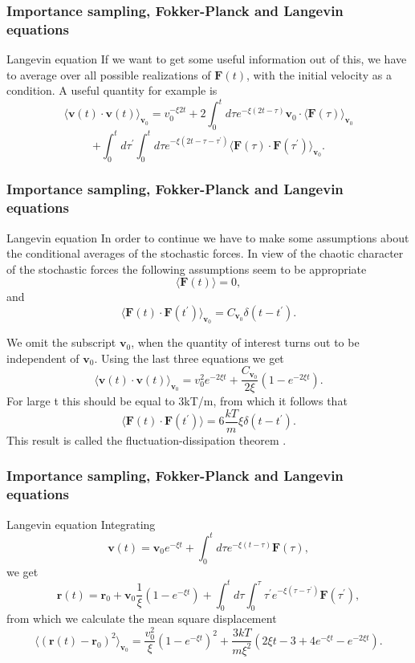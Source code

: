 \documentclass{beamer}
\begin{document}
\begin{frame}
\frametitle{Importance sampling, Fokker-Planck and Langevin equations}

\begin{block}{Langevin equation }
If we want to get some useful information out of this, we have to average over all possible realizations of 
$\mathbf{F}(t)$, with the initial velocity as a condition. A useful quantity for example is
\[ 
\langle \mathbf{v}(t)\cdot \mathbf{v}(t)\rangle_{\mathbf{v}_{0}}=v_{0}^{-\xi 2t}
+2\int_{0}^{t}d\tau e^{-\xi (2t-\tau)}\mathbf{v}_{0}\cdot \langle \mathbf{F}(\tau )\rangle_{\mathbf{v}_{0}}
\]
\[  	  	
 +\int_{0}^{t}d\tau ^{\prime }\int_{0}^{t}d\tau e^{-\xi (2t-\tau -\tau ^{\prime })}
\langle \mathbf{F}(\tau )\cdot \mathbf{F}(\tau ^{\prime })\rangle_{ \mathbf{v}_{0}}.
\]
\end{block}
\end{frame}

\begin{frame}
\frametitle{Importance sampling, Fokker-Planck and Langevin equations}

\begin{block}{Langevin equation }
In order to continue we have to make some assumptions about the conditional averages of the stochastic forces. 
In view of the chaotic character of the stochastic forces the following 
assumptions seem to be appropriate
\[ 
\langle \mathbf{F}(t)\rangle=0, 
\]
and
\[
\langle \mathbf{F}(t)\cdot \mathbf{F}(t^{\prime })\rangle_{\mathbf{v}_{0}}=  C_{\mathbf{v}_{0}}\delta (t-t^{\prime }).
\] 	

We omit the subscript $\mathbf{v}_{0}$, when the quantity of interest turns out to be independent of $\mathbf{v}_{0}$. Using the last three equations we get
 \[
\langle \mathbf{v}(t)\cdot \mathbf{v}(t)\rangle_{\mathbf{v}_{0}}=v_{0}^{2}e^{-2\xi t}+\frac{C_{\mathbf{v}_{0}}}{2\xi }(1-e^{-2\xi t}).
\]
For large t this should be equal to 3kT/m, from which it follows that
\[
\langle \mathbf{F}(t)\cdot \mathbf{F}(t^{\prime })\rangle =6\frac{kT}{m}\xi \delta (t-t^{\prime }). 
\]
This result is called the fluctuation-dissipation theorem .
\end{block}
\end{frame}

\begin{frame}
\frametitle{Importance sampling, Fokker-Planck and Langevin equations}

\begin{block}{Langevin equation }
Integrating 
 \[ 
\mathbf{v}(t)=\mathbf{v}_{0}e^{-\xi t}+\int_{0}^{t}d\tau e^{-\xi (t-\tau )}\mathbf{F }(\tau ), 
\] 
we get
\[
\mathbf{r}(t)=\mathbf{r}_{0}+\mathbf{v}_{0}\frac{1}{\xi }(1-e^{-\xi t})+
\int_0^td\tau \int_0^{\tau}\tau ^{\prime } e^{-\xi (\tau -\tau ^{\prime })}\mathbf{F}(\tau ^{\prime }), 
\]
from which we calculate the mean square displacement 
\[
\langle ( \mathbf{r}(t)-\mathbf{r}_{0})^{2}\rangle _{\mathbf{v}_{0}}=\frac{v_0^2}{\xi}(1-e^{-\xi t})^{2}+\frac{3kT}{m\xi ^{2}}(2\xi t-3+4e^{-\xi t}-e^{-2\xi t}). 
\]
\end{block}
\end{frame}
\end{document}
